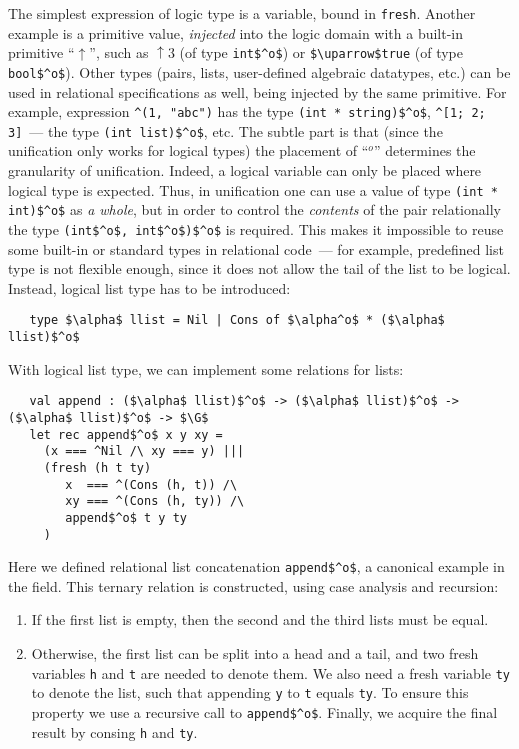 The simplest expression of logic type is a variable, bound in \lstinline|fresh|. Another example is a primitive value, \emph{injected} into the logic domain with a built-in primitive ``$\uparrow$'', such as $\uparrow\!3$ (of type \lstinline|int$^o$|) or \lstinline|$\uparrow$true| (of type \lstinline|bool$^o$|).
Other types (pairs, lists, user-defined algebraic datatypes, etc.) can be used in relational specifications as well, being injected by the same primitive. For example, expression \lstinline{^(1, "abc")} has the type \lstinline{(int * string)$^o$}, \lstinline{^[1; 2; 3]}~--- the type \lstinline{(int list)$^o$}, etc. The subtle part is that (since the unification only works for logical types) the placement of ``$^o$'' determines the granularity of unification. Indeed, a logical variable can only be placed where logical type is expected. Thus, in unification one can use a value of type \lstinline{(int * int)$^o$} as \emph{a whole}, but in order to control the \emph{contents} of the pair relationally the type \lstinline{(int$^o$, int$^o$)$^o$} is required. This makes it impossible to reuse some built-in or standard types in relational code~--- for example, predefined list type is not flexible enough, since it does not allow the tail of the list to be logical. Instead, logical list type has to be introduced:

\begin{lstlisting}
   type $\alpha$ llist = Nil | Cons of $\alpha^o$ * ($\alpha$ llist)$^o$
\end{lstlisting}

With logical list type, we can implement some relations for lists:

\begin{lstlisting}
   val append : ($\alpha$ llist)$^o$ -> ($\alpha$ llist)$^o$ -> ($\alpha$ llist)$^o$ -> $\G$
   let rec append$^o$ x y xy =
     (x === ^Nil /\ xy === y) |||
     (fresh (h t ty)
        x  === ^(Cons (h, t)) /\
        xy === ^(Cons (h, ty)) /\
        append$^o$ t y ty
     ) 
\end{lstlisting}

Here we defined relational list concatenation \lstinline{append$^o$}, a canonical example in the field. This ternary relation is constructed,
using case analysis and recursion:

\begin{enumerate}
\item If the first list is empty, then the second and the third lists must be equal.
\item Otherwise, the first list can be split into a head and a tail, and two fresh variables \lstinline{h} and \lstinline{t} are needed to denote them.
We also need a fresh variable \lstinline{ty} to denote the list, such that appending \lstinline{y} to \lstinline{t} equals \lstinline{ty}. To ensure this
property we use a recursive call to \lstinline{append$^o$}. Finally, we acquire the final result by consing \lstinline{h} and \lstinline{ty}. 
\end{enumerate}

